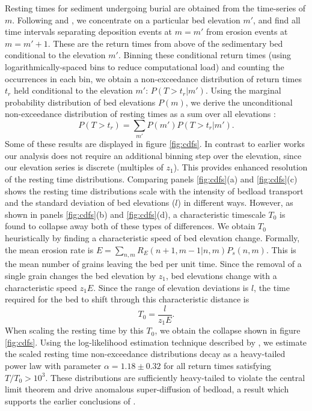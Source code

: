 \documentclass[draft]{agujournal2018}
\begin{document}
Resting times for sediment undergoing burial are obtained from the time-series of $m$.
Following \citet{Voepel2013} and \citet{Martin2014}, we concentrate on a particular bed elevation $m'$, and find all time intervals separating deposition events at $m=m'$ from erosion events at $m=m'+1$.
These are the return times from above of the sedimentary bed conditional to the elevation $m'$.
Binning these conditional return times (using logarithmically-spaced bins to reduce computational load) and counting the occurrences in each bin, we obtain a non-exceedance distribution of return times $t_r$ held conditional to the elevation $m'$: $P(T>t_r|m')$.
Using the marginal probability distribution of bed elevations $P(m)$, we derive the unconditional non-exceedance distribution of resting times as a sum over all elevations \citep{Yang1971, Nakagawa1980, Voepel2013, Martin2014}:
\begin{equation} P(T>t_r) = \sum_{m'} P(m') P(T>t_r|m') .\end{equation}
Some of these results are displayed in figure \ref{fig:cdfs}.
In contrast to earlier works our analysis does not require an additional binning step over the elevation, since our elevation series is discrete (multiples of $z_1$).
This provides enhanced resolution of the resting time distributions.
Comparing panels \ref{fig:cdfs}(a) and \ref{fig:cdfs}(c) shows the resting time distributions scale with the intensity of bedload transport and the standard deviation of bed elevations ($l$) in different ways.
However, as shown in panels \ref{fig:cdfs}(b) and \ref{fig:cdfs}(d), a characteristic timescale $T_0$ is found to collapse away both of these types of differences.
We obtain $T_0$ heuristically by finding a characteristic speed of bed elevation change.
Formally, the mean erosion rate is $E = \sum_{n,m}R_E(n+1,m-1|n,m)P_s(n,m)$.
This is the mean number of grains leaving the bed per unit time.
Since the removal of a single grain changes the bed elevation by $z_1$, bed elevations change with a characteristic speed $z_1 E$.
Since the range of elevation deviations is $l$, the time required for the bed to shift through this characteristic distance is
\begin{equation} T_0 = \frac{l}{z_1 E}.\label{eq:time}\end{equation}
When scaling the resting time by this $T_0$, we obtain the collapse shown in figure \ref{fig:cdfs}.
Using the log-likelihood estimation technique described by \citet{Newman2005}, we estimate the scaled resting time non-exceedance distributions decay as a heavy-tailed power law with parameter $\alpha = 1.18 \pm 0.32$ for all return times satisfying $T/T_0 > 10^3$.
These distributions are sufficiently heavy-tailed to violate the central limit theorem and drive anomalous super-diffusion of bedload, a result which supports the earlier conclusions of \citep{Martin2014}.
\end{document}
